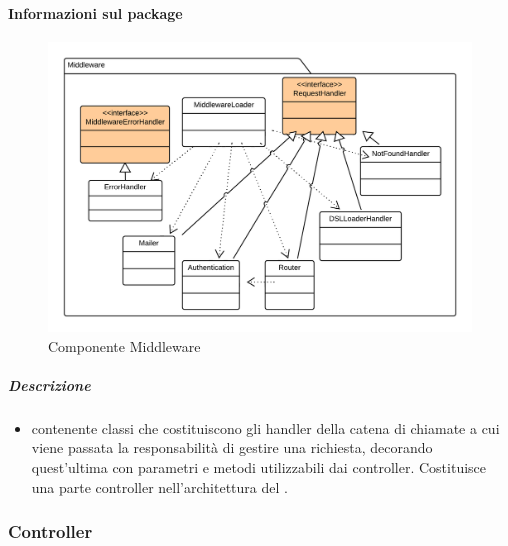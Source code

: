  \paragraph{Informazioni sul package} 
    \begin{figure}[H] 
      \begin{center} 
        \includegraphics[width=\textwidth]{packages/Back-end::Lib::Controller::Middleware.png}  
        \caption{Componente Middleware}
      \end{center}  
    \end{figure} 
  \subparagraph{Descrizione} 
    \begin{itemize}
    \item[]  contenente classi che costituiscono gli handler della catena di chiamate a cui viene
passata la responsabilità di gestire una richiesta, decorando quest’ultima con parametri e
metodi utilizzabili dai controller. Costituisce una parte controller nell’architettura 
del  .

    \end{itemize} 
  \subsubsection{Controller}
